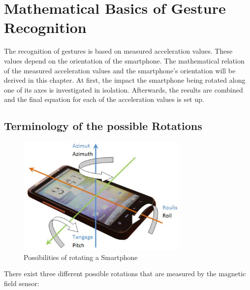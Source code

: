 \documentclass[12pt, a4paper, oneside, british]{article}
\begin{document}
\onehalfspacing
\setlength\epigraphrule{0pt}
\setlength{\epigraphwidth}{0.8\textwidth}
\renewcommand{\epigraphflush}{flushleft}


\setcounter{page}{1}

\section{Mathematical Basics of Gesture Recognition}
The recognition of gestures is based on measured acceleration values. These
values depend on
the orientation of the smartphone. The mathematical relation of the measured
acceleration values and the smartphone's orientation will be derived in this
chapter. At first, the impact the smartphone being rotated along one of its axes
is investigated in isolation. Afterwards, the results are combined and the final
equation for each of the acceleration values is set up.

\subsection{Terminology of the possible Rotations}

\begin{figure}
\centering
\captionsetup{justification=centering}
\includegraphics[width=0.75\textwidth]{res/mathstuff/rotations.jpg}
\caption{Possibilities of rotating a Smartphone\protect\footnotemark}
\label{fig:DataModel}
\end{figure}

There exist three different possible rotations that are measured by the magnetic field sensor:
\end{document}
